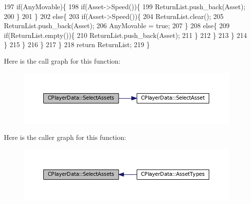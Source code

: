 \begin{DoxyCode}
197                     \textcolor{keywordflow}{if}(AnyMovable)\{
198                         \textcolor{keywordflow}{if}(Asset->Speed())\{
199                             ReturnList.push\_back(Asset);
200                         \}
201                     \}
202                     \textcolor{keywordflow}{else}\{
203                         \textcolor{keywordflow}{if}(Asset->Speed())\{
204                             ReturnList.clear();
205                             ReturnList.push\_back(Asset);
206                             AnyMovable = \textcolor{keyword}{true};
207                         \}
208                         \textcolor{keywordflow}{else}\{
209                             \textcolor{keywordflow}{if}(ReturnList.empty())\{
210                                 ReturnList.push\_back(Asset);
211                             \}
212                         \}
213                     \}
214                 \}
215             \}
216         \}
217     \}
218     \textcolor{keywordflow}{return} ReturnList;
219 \}
\end{DoxyCode}
Here is the call graph for this function\+:\nopagebreak
\begin{figure}[H]
\begin{center}
\leavevmode
\includegraphics[width=350pt]{classCPlayerData_afb3303a53687383e4101d4de37391d84_cgraph}
\end{center}
\end{figure}
Here is the caller graph for this function\+:\nopagebreak
\begin{figure}[H]
\begin{center}
\leavevmode
\includegraphics[width=350pt]{classCPlayerData_afb3303a53687383e4101d4de37391d84_icgraph}
\end{center}
\end{figure}
\hypertarget{classCPlayerData_a3ac1393306e8a3f7c95d13ca01e429a7}{}\label{classCPlayerData_a3ac1393306e8a3f7c95d13ca01e429a7} 
